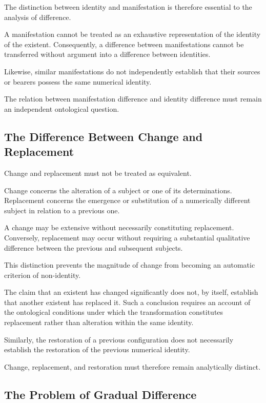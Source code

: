 The distinction between identity and manifestation
is therefore essential to the analysis of difference.

A manifestation cannot be treated as an exhaustive
representation of the identity of the existent.
Consequently, a difference between manifestations
cannot be transferred without argument into a
difference between identities.

Likewise, similar manifestations do not independently
establish that their sources or bearers possess
the same numerical identity.

The relation between manifestation difference and
identity difference must remain an independent
ontological question.

\subsection{The Difference Between Change and Replacement}

Change and replacement must not be treated as
equivalent.

Change concerns the alteration of a subject or
one of its determinations. Replacement concerns
the emergence or substitution of a numerically
different subject in relation to a previous one.

A change may be extensive without necessarily
constituting replacement. Conversely, replacement
may occur without requiring a substantial qualitative
difference between the previous and subsequent
subjects.

This distinction prevents the magnitude of change
from becoming an automatic criterion of non-identity.

The claim that an existent has changed significantly
does not, by itself, establish that another existent
has replaced it. Such a conclusion requires an
account of the ontological conditions under which
the transformation constitutes replacement rather
than alteration within the same identity.

Similarly, the restoration of a previous configuration
does not necessarily establish the restoration
of the previous numerical identity.

Change, replacement, and restoration must therefore
remain analytically distinct.

\subsection{The Problem of Gradual Difference}

